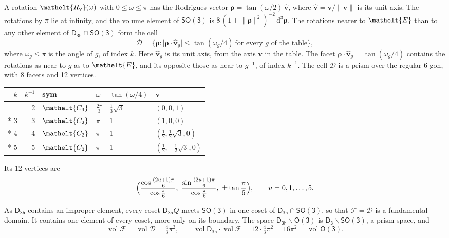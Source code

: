 \documentclass[10pt,a4paper]{article}
\numberwithin{equation}{section}
\newcommand{\eltfont}[1]{{\let\sigma\eltsigma\mathelt{#1}}}
\newcommand{\grp}[1]{\mathsf{#1}}
\newcommand{\cls}[1]{\eltfont{#1}}
\newcommand{\elt}[1]{\eltfont{#1}}
\newcommand{\dirvec}[3]{(#1, #2, #3)}
\newcommand{\unitaxis}{\hat{\mathbf{v}}}
\newcommand{\vv}{\mathbf{v}}
\newcommand{\diff}{\mathrm{d}}
\newcommand{\vol}{\operatorname{vol}}
\newcommand{\rodrigues}{\boldsymbol{\rho}}
\newcommand{\fcell}{\mathcal{D}}
\newcommand{\fdomain}{\mathcal{F}}
\begin{document}
\leavevmode\label{n:vector.rodrigues}\label{n:vector.unitaxis}A rotation $\elt{R_{\vv}}(\omega)$ with $0 \le \omega \le \pi$ has the Rodrigues vector $\rodrigues = \tan(\omega/2)\,\unitaxis$, where $\unitaxis = \vv/\lVert\vv\rVert$ is its unit axis. The rotations by $\pi$ lie at infinity, and the volume element of \href{SO3.pdf}{$\grp{SO(3)}$} is $8\,(1 + \lVert\rodrigues\rVert^2)^{-2}\,\diff^3\rodrigues$.
\leavevmode\label{n:set.cell}The rotations nearer to $\elt{E}$ than to any other element of $\grp{D_{3h}} \cap \grp{SO(3)}$ form the cell
\begin{equation}\label{e:cell}\fcell = \bigl\{\rodrigues : \lvert\rodrigues\cdot\unitaxis_g\rvert \le \tan(\omega_g/4)\ \text{for every $g$ of the table}\bigr\},\end{equation}
where $\omega_g \le \pi$ is the angle of $g$, of index $k$. Here $\unitaxis_g$ is its unit axis, from the axis $\vv$ in the table. The facet $\rodrigues\cdot\unitaxis_g = \tan(\omega_g/4)$ contains the rotations as near to $g$ as to $\elt{E}$, and its opposite those as near to $g^{-1}$, of index $k^{-1}$. The cell $\fcell$ is a prism over the regular 6-gon, with 8 facets and 12 vertices.
{\small{\renewcommand{\arraystretch}{1.3}\begin{longtable}{@{}rrllll@{}}\toprule
$k$ & $k^{-1}$ & sym & $\omega$ & $\tan(\omega/4)$ & $\vv$\\\midrule\endhead
\bottomrule\endfoot\endlastfoot
1 & 2 & $\cls{C_{3}}$ & $\tfrac{2\pi}{3}$ & $\tfrac{1}{3}\sqrt{3}$ & $\dirvec{0}{0}{1}$\\*
3 & 3 & $\cls{C_{2}}$ & $\pi$ & $1$ & $\dirvec{1}{0}{0}$\\*
4 & 4 & $\cls{C_{2}}$ & $\pi$ & $1$ & $\dirvec{\tfrac{1}{2}}{\tfrac{1}{2}\sqrt{3}}{0}$\\*
5 & 5 & $\cls{C_{2}}$ & $\pi$ & $1$ & $\dirvec{\tfrac{1}{2}}{-\tfrac{1}{2}\sqrt{3}}{0}$\\
\bottomrule\end{longtable}}}
\leavevmode\label{n:local.vertex.u}Its 12 vertices are
\begin{equation}\label{e:prism}\Bigl(\frac{\cos\frac{(2u+1)\pi}{6}}{\cos\frac{\pi}{6}},\ \frac{\sin\frac{(2u+1)\pi}{6}}{\cos\frac{\pi}{6}},\ \pm\tan\frac{\pi}{6}\Bigr),\qquad u = 0, 1, \dots, 5.\end{equation}

\leavevmode\label{n:set.fundamental}As $\grp{D_{3h}}$ contains an improper element, every coset $\grp{D_{3h}}Q$ meets \href{SO3.pdf}{$\grp{SO(3)}$} in one coset of $\grp{D_{3h}} \cap \grp{SO(3)}$, so that $\fdomain = \fcell$ is a fundamental domain. It contains one element of every coset, more only on its boundary.
The space $\grp{D_{3h}}\backslash\grp{O(3)}$ is $\grp{D_{3}}\backslash\grp{SO(3)}$, a prism space, and
\begin{equation}\label{e:volume}\vol\fdomain = \vol\fcell = \tfrac{4}{3}\pi^2,\qquad \vol\grp{D_{3h}}\cdot\vol\fdomain = 12\cdot \tfrac{4}{3}\pi^2 = 16\pi^2 = \vol\grp{O(3)}.\end{equation}
\end{document}
